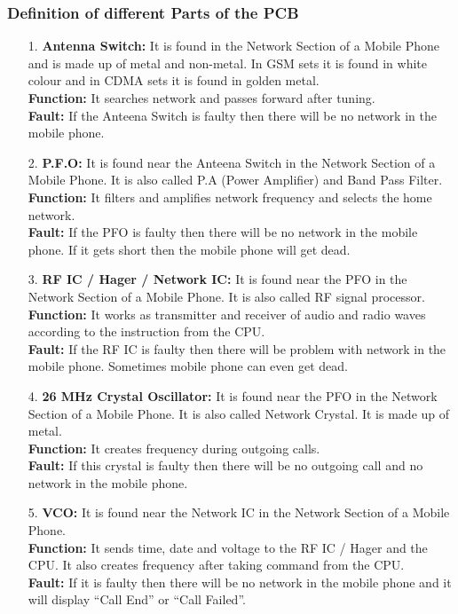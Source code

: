 \subsubsection{Definition of different Parts of the PCB}
\begin{itemize}
\item[1.] \textbf{Antenna Switch:} It is found in the Network Section of a Mobile Phone and is made up of metal and non-metal. In GSM sets it is found in white colour and in CDMA sets it is found in golden metal.\\ 
\textbf{Function:} It searches network and passes forward after tuning.\\
\textbf{Fault:} If the Anteena Switch is faulty then there will be no network in the mobile phone.

\item[2.] \textbf{P.F.O:} It is found near the Anteena Switch in the Network Section of a Mobile Phone. It is also called P.A (Power Amplifier) and Band Pass Filter.\\
\textbf{Function:} It filters and amplifies network frequency and selects the home network.\\
\textbf{Fault:} If the PFO is faulty then there will be no network in the mobile phone. If it gets short then the mobile phone will get dead.

\item[3.] \textbf{RF IC / Hager / Network IC:} It is found near the PFO in the Network Section of a Mobile Phone. It is also called RF signal processor.\\
\textbf{Function:} It works as transmitter and receiver of audio and radio waves according to the instruction from the CPU.\\
\textbf{Fault:} If the RF IC is faulty then there will be problem with network in the mobile phone. Sometimes mobile phone can even get dead.

\item[4.] \textbf{26 MHz Crystal Oscillator:} It is found near the PFO in the Network Section of a Mobile Phone. It is also called Network Crystal. It is made up of metal.\\
\textbf{Function:} It creates frequency during outgoing calls.\\
\textbf{Fault:} If this crystal is faulty then there will be no outgoing call and no network in the mobile phone.

\item[5.] \textbf{VCO:} It is found near the Network IC in the Network Section of a Mobile Phone.\\
\textbf{Function:} It sends time, date and voltage to the RF IC / Hager and the CPU. It also creates frequency after taking command from the CPU.\\
\textbf{Fault:} If it is faulty then there will be no network in the mobile phone and it will display “Call End” or “Call Failed”.


\end{itemize}
